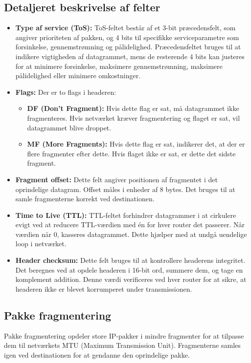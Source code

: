 \subsection*{Detaljeret beskrivelse af felter}
\begin{itemize}
	\item \textbf{Type af service (ToS):} ToS-feltet består af et 3-bit præcedensfelt, som angiver prioriteten af pakken, og 4 bits til specifikke serviceparametre som forsinkelse, gennemstrømning og pålidelighed. Præcedensfeltet bruges til at indikere vigtigheden af datagrammet, mens de resterende 4 bits kan justeres for at minimere forsinkelse, maksimere gennemstrømning, maksimere pålidelighed eller minimere omkostninger.
	\item \textbf{Flags:} Der er to flags i headeren:
	\begin{itemize}
		\item \textbf{DF (Don’t Fragment):} Hvis dette flag er sat, må datagrammet ikke fragmenteres. Hvis netværket kræver fragmentering og flaget er sat, vil datagrammet blive droppet.
		\item \textbf{MF (More Fragments):} Hvis dette flag er sat, indikerer det, at der er flere fragmenter efter dette. Hvis flaget ikke er sat, er dette det sidste fragment.
	\end{itemize}
	\item \textbf{Fragment offset:} Dette felt angiver positionen af fragmentet i det oprindelige datagram. Offset måles i enheder af 8 bytes. Det bruges til at samle fragmenterne korrekt ved destinationen.
	\item \textbf{Time to Live (TTL):} TTL-feltet forhindrer datagrammer i at cirkulere evigt ved at reducere TTL-værdien med én for hver router det passerer. Når værdien når 0, kasseres datagrammet. Dette hjælper med at undgå uendelige loop i netværket.
	\item \textbf{Header checksum:} Dette felt bruges til at kontrollere headerens integritet. Det beregnes ved at opdele headeren i 16-bit ord, summere dem, og tage en komplement addition. Denne værdi verificeres ved hver router for at sikre, at headeren ikke er blevet korrumperet under transmissionen.
\end{itemize}

\subsection{Pakke fragmentering}
Pakke fragmentering opdeler store IP-pakker i mindre fragmenter for at tilpasse dem til netværkets MTU (Maximum Transmission Unit). Fragmenterne samles igen ved destinationen for at gendanne den oprindelige pakke.

